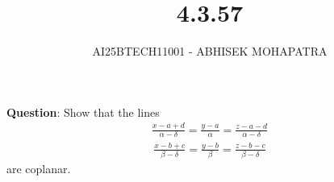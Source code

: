 \documentclass[journal,12pt,onecolumn]{IEEEtran}
\begin{document}
\title{4.3.57}
\author{AI25BTECH11001 - ABHISEK MOHAPATRA}
{\let\newpage\relax\maketitle}
	 	\textbf{Question}:
		Show that the lines
		\begin{align}
		\frac{x-a+d}{\alpha-\delta}=\frac{y-a}{\alpha}=\frac{z-a-d}{\alpha-\delta}
		\end{align}
		\begin{align}
		\frac{x-b+c}{\beta-\delta}=\frac{y-b}{\beta}=\frac{z-b-c}{\beta-\delta}
		\end{align}
are coplanar.
		
\end{document}
